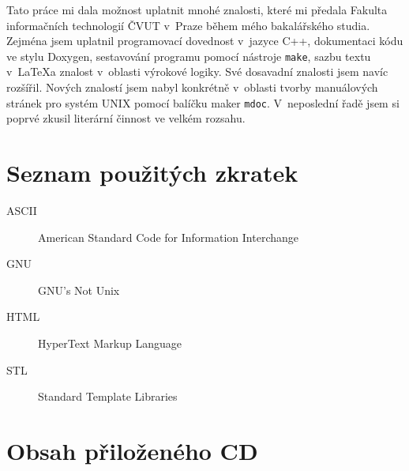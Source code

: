 \documentclass[thesis=B,czech,hidelinks]{thesis}[2012/06/26]
\begin{document}
%
%
%

\begin{conclusion}
Tato práce mi dala možnost uplatnit mnohé znalosti, které mi předala Fakulta informačních technologií ČVUT v~Praze během mého bakalářského studia. Zejména jsem uplatnil programovací dovednost v~jazyce C++, dokumentaci kódu ve stylu Doxygen, sestavování programu pomocí nástroje \texttt{make}, sazbu textu v~\LaTeX a znalost v~oblasti výrokové logiky. Své dosavadní znalosti jsem navíc rozšířil. Nových znalostí jsem nabyl konkrétně v~oblasti tvorby manuálových stránek pro systém UNIX pomocí balíčku maker \texttt{mdoc}. V~neposlední řadě jsem si poprvé zkusil literární činnost ve velkém rozsahu.
\end{conclusion}

%
%
%




\appendix

%
%
%

\chapter{Seznam použitých zkratek}

\begin{description}
	\item[ASCII] American Standard Code for Information Interchange
	\item[GNU] GNU's Not Unix
	\item[HTML] HyperText Markup Language
	\item[STL] Standard Template Libraries
\end{description}

%
%
%

\chapter{Obsah přiloženého CD}

\begin{figure}
\end{figure}
\end{document}
